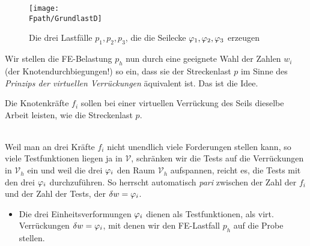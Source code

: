 \begin{figure}[tbp] \centering
\if {} \sidecaption \fi
\texttt{[image: \\Fpath/GrundlastD]}
\caption{Die drei Lastf\"{a}lle $p_1, p_2, p_3$, die die Seilecke $\varphi_1, \varphi_2,
\varphi_3$ erzeugen} \label{GrundlastD}
\end{figure}%
Wir stellen die FE-Belastung $p_{h}$ nun durch eine geeignete Wahl der Zahlen $w_i$ (der Knotendurchbiegungen!) so ein, dass sie der Streckenlast $p$ im Sinne des {\em Prinzips der virtuellen Verr\"{u}ckungen\/} \"{a}quivalent ist. Das ist die Idee.\\

\hspace*{-12pt}\colorbox{highlightBlue}{\parbox{0.98\textwidth}{ Die Knotenkr\"{a}fte $f_i$ sollen bei einer
virtuellen Verr\"{u}ckung des Seils dieselbe Arbeit leisten, wie die Streckenlast $p$.}}\\

Weil man an drei Kr\"{a}fte $f_i$ nicht unendlich viele Forderungen stellen kann, so viele Testfunktionen liegen ja in $\mathcal{V}$, schr\"{a}nken wir die Tests auf die Verr\"{u}ckungen in $\mathcal{V}_h$ ein und weil die drei $\varphi_i$ den Raum $\mathcal{V}_h$ aufspannen, reicht es, die Tests mit den drei $\varphi_i$ durchzuf\"{u}hren. So herrscht automatisch {\em pari\/} zwischen der Zahl der $f_i$ und der Zahl der Tests, der $\delta w = \varphi_i$.\\

\begin{itemize}
\item  Die drei Einheitsverformungen $\varphi_i$ dienen als
Testfunktionen, als virt. Verr\"{u}ckungen $\delta w = \varphi_i$, mit denen wir den FE-Lastfall $p_h$ auf die Probe stellen.
\end{itemize}

